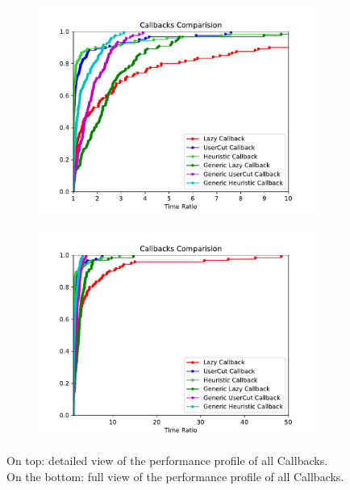 \begin{figure}[h!]
  \centering
  \begin{subfigure}[b]{0.97\linewidth}
    \includegraphics[width=\linewidth]{media/AllCallbacks.pdf}
  \end{subfigure}
  \begin{subfigure}[b]{0.97\linewidth}
  \ContinuedFloat
    \includegraphics[width=\linewidth]{media/AllCallbacks1.pdf}
  \end{subfigure}
  \caption{On top: detailed view of the performance profile of all Callbacks. \\On the bottom: full view of the performance profile of all Callbacks.}
      \label{fig:allcall}
\end{figure}

